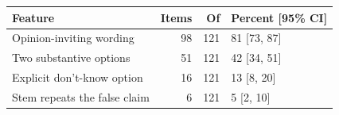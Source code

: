 \begin{tabular}{lrrl}
\toprule
Feature & Items & Of & Percent [95\% CI] \\
\midrule
Opinion-inviting wording & 98 & 121 & 81 [73, 87] \\
Two substantive options & 51 & 121 & 42 [34, 51] \\
Explicit don't-know option & 16 & 121 & 13 [8, 20] \\
Stem repeats the false claim &  6 & 121 & 5 [2, 10] \\
\bottomrule
\end{tabular}
